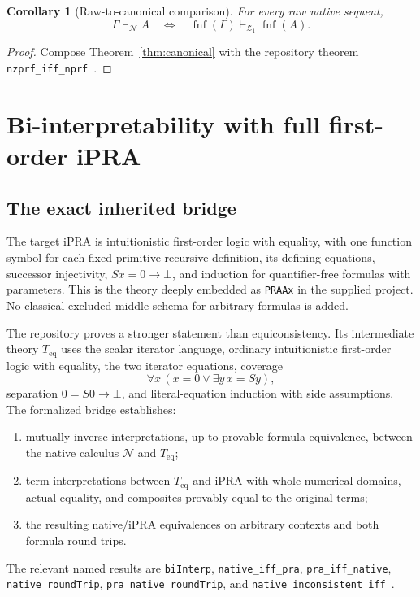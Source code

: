 \documentclass[11pt]{article}
\newtheorem{corollary}[theorem]{Corollary}
\theoremstyle{definition}\newtheorem{definition}[theorem]{Definition}
\newcommand{\Zone}{\mathcal Z_1}
\newcommand{\N}{\mathcal N}
\newcommand{\fnf}{\operatorname{fnf}}
\newcommand{\Teq}{T_{\mathrm{eq}}}
\begin{document}
\begin{corollary}[Raw-to-canonical comparison]\label{cor:rawnormal}
For every raw native sequent,
\[
 \Gamma\vdash_{\N}A
 \quad\Longleftrightarrow\quad
 \fnf(\Gamma)\vdash_{\Zone}\fnf(A).
\]
\end{corollary}
\begin{proof}
Compose Theorem~\ref{thm:canonical} with the repository theorem
\texttt{nzprf\_iff\_nprf}~\cite{normal}.
\end{proof}

\section{Bi-interpretability with full first-order iPRA}
\label{sec:biinterpretation}

\subsection{The exact inherited bridge}

The target iPRA is intuitionistic first-order logic with equality, with
one function symbol for each fixed primitive-recursive definition, its
defining equations, successor injectivity, $Sx=0\to\bot$, and induction
for quantifier-free formulas with parameters. This is the theory deeply
embedded as \texttt{PRAAx} in the supplied project. No classical
excluded-middle schema for arbitrary formulas is added.

The repository proves a stronger statement than equiconsistency.
Its intermediate theory $\Teq$ uses the scalar iterator language,
ordinary intuitionistic first-order logic with equality, the two iterator
equations, coverage
\[
 \forall x\,(x=0\lor\exists y\,x=Sy),
\]
separation $0=S0\to\bot$, and literal-equation induction with side
assumptions. The formalized bridge establishes:
\begin{enumerate}
\item mutually inverse interpretations, up to provable formula
equivalence, between the native calculus $\N$ and $\Teq$;
\item term interpretations between $\Teq$ and iPRA with whole numerical
domains, actual equality, and composites provably equal to the original
terms;
\item the resulting native/iPRA equivalences on arbitrary contexts and
both formula round trips.
\end{enumerate}
The relevant named results are \texttt{biInterp},
\texttt{native\_iff\_pra}, \texttt{pra\_iff\_native},
\texttt{native\_roundTrip}, \texttt{pra\_native\_roundTrip}, and
\texttt{native\_inconsistent\_iff}~\cite{bridge}.
\end{document}
